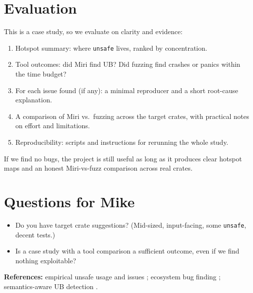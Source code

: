 \documentclass[11pt]{article}
\begin{document}
\section*{Evaluation}
This is a case study, so we evaluate on clarity and evidence:
\begin{enumerate}[leftmargin=*]
  \item Hotspot summary: where \texttt{unsafe} lives, ranked by concentration.
  \item Tool outcomes: did Miri find UB? Did fuzzing find crashes or panics within the time budget?
  \item For each issue found (if any): a minimal reproducer and a short root-cause explanation.
  \item A comparison of Miri vs.\ fuzzing across the target crates, with practical notes on effort and limitations.
  \item Reproducibility: scripts and instructions for rerunning the whole study.
\end{enumerate}
If we find no bugs, the project is still useful as long as it produces clear hotspot maps and an honest Miri-vs-fuzz comparison across real crates.

\section*{Questions for Mike}
\begin{itemize}[leftmargin=*]
  \item Do you have target crate suggestions? (Mid-sized, input-facing, some \texttt{unsafe}, decent tests.)
  \item Is a case study with a tool comparison a sufficient outcome, even if we find nothing exploitable?
\end{itemize}

\vspace{0.5em}
\noindent\textbf{References:} empirical unsafe usage and issues \cite{EvansICSE20,AstrauskasOOPSLA20,QinPLDI20}; ecosystem bug finding \cite{BaeSOSP21}; semantics-aware UB detection \cite{JungPOPL26}.
\end{document}
